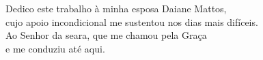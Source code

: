 \begin{dedicatoria}
  \vspace*{\fill}
  \begin{flushright}
    Dedico este trabalho à minha esposa Daiane Mattos,\\
    cujo apoio incondicional me sustentou nos dias mais difíceis.\\
    Ao Senhor da seara, que me chamou pela Graça\\
    e me conduziu até aqui.
  \end{flushright}
\end{dedicatoria}
